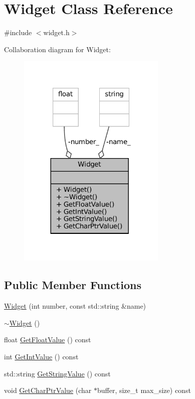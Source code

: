 \hypertarget{classWidget}{}\section{Widget Class Reference}
\label{classWidget}


{\ttfamily \#include $<$widget.\+h$>$}



Collaboration diagram for Widget\+:
\nopagebreak
\begin{figure}[H]
\begin{center}
\leavevmode
\includegraphics[width=200pt]{classWidget__coll__graph}
\end{center}
\end{figure}
\subsection*{Public Member Functions}
\begin{DoxyCompactItemize}
\item 
\hyperlink{classWidget_ab573b75a8a69d29c298af2485fb9cda9}{Widget} (int number, const std\+::string \&name)
\item 
\hyperlink{classWidget_aa24f66bcbaaec6d458b0980e8c8eae65}{$\sim$\+Widget} ()
\item 
float \hyperlink{classWidget_abf639d975e02cabda8132873aca1a333}{Get\+Float\+Value} () const
\item 
int \hyperlink{classWidget_a15e7d0423020a7a98063a749fb97bdd3}{Get\+Int\+Value} () const
\item 
std\+::string \hyperlink{classWidget_a7a6e3a7fca3a9373f631c94dc1494d22}{Get\+String\+Value} () const
\item 
void \hyperlink{classWidget_a50791a556979f22f5593383143c7f815}{Get\+Char\+Ptr\+Value} (char $\ast$buffer, size\+\_\+t max\+\_\+size) const
\end{DoxyCompactItemize}
